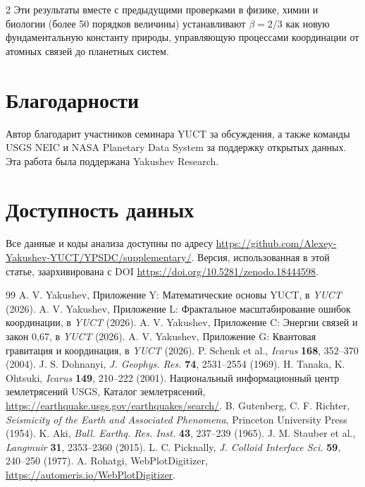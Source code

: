 \documentclass[11pt,a4paper]{article}
\newcommand{\betaf}{\beta}
\begin{document}
\begin{multicols}{2}
		Эти результаты вместе с предыдущими проверками в физике, химии и биологии (более 50 порядков величины) устанавливают \(\betaf = 2/3\) как новую фундаментальную константу природы, управляющую процессами координации от атомных связей до планетных систем.
		
		\section*{Благодарности}
		
		Автор благодарит участников семинара YUCT за обсуждения, а также команды USGS NEIC и NASA Planetary Data System за поддержку открытых данных. Эта работа была поддержана Yakushev Research.
		
		\section*{Доступность данных}
		
		Все данные и коды анализа доступны по адресу \url{https://github.com/Alexey-Yakushev-YUCT/YPSDC/supplementary/}. Версия, использованная в этой статье, заархивирована с DOI \url{https://doi.org/10.5281/zenodo.18444598}.
		
		\begin{thebibliography}{99}
			 A. V. Yakushev, Приложение Y: Математические основы YUCT, в \emph{YUCT} (2026).
			 A. V. Yakushev, Приложение L: Фрактальное масштабирование ошибок координации, в \emph{YUCT} (2026).
			 A. V. Yakushev, Приложение C: Энергии связей и закон 0,67, в \emph{YUCT} (2026).
			 A. V. Yakushev, Приложение G: Квантовая гравитация и координация, в \emph{YUCT} (2026).
			 P. Schenk et al., \emph{Icarus} \textbf{168}, 352–370 (2004).
			 J. S. Dohnanyi, \emph{J. Geophys. Res.} \textbf{74}, 2531–2554 (1969).
			 H. Tanaka, K. Ohtsuki, \emph{Icarus} \textbf{149}, 210–222 (2001).
			 Национальный информационный центр землетрясений USGS, Каталог землетрясений, \url{https://earthquake.usgs.gov/earthquakes/search/}.
			 B. Gutenberg, C. F. Richter, \emph{Seismicity of the Earth and Associated Phenomena}, Princeton University Press (1954).
			 K. Aki, \emph{Bull. Earthq. Res. Inst.} \textbf{43}, 237–239 (1965).
			 J. M. Stauber et al., \emph{Langmuir} \textbf{31}, 2353–2360 (2015).
			 L. C. Picknally, \emph{J. Colloid Interface Sci.} \textbf{59}, 240–250 (1977).
			 A. Rohatgi, WebPlotDigitizer, \url{https://automeris.io/WebPlotDigitizer}.
		\end{thebibliography}
		
	\end{multicols}
\end{document}
